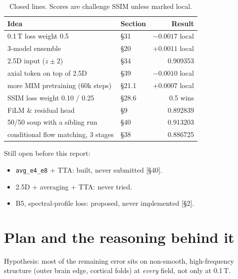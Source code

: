 \documentclass[10pt,a4paper]{article}
\begin{document}
\begin{table}[H]
\centering\small
\begin{tabular}{llr}
\toprule
Idea & Section & Result \\
\midrule
0.1\,T loss weight 0.5                & \S31   & $-0.0017$ local \\
3-model ensemble                      & \S20   & $+0.0011$ local \\
2.5D input ($z\pm2$)                  & \S34   & 0.909353 \\
axial token on top of 2.5D            & \S39   & $-0.0010$ local \\
more MIM pretraining (60k steps)      & \S21.1 & $+0.0007$ local \\
SSIM loss weight 0.10 / 0.25          & \S28.6 & 0.5 wins \\
FiLM \& residual head                 & \S9    & 0.892839 \\
50/50 soup with a sibling run         & \S40   & 0.913203 \\
conditional flow matching, 3 stages   & \S38   & 0.886725 \\
\bottomrule
\end{tabular}
\caption{Closed lines. Scores are challenge SSIM unless marked local.}
\end{table}

Still open before this report:
\begin{itemize}
  \item \texttt{avg\_e4\_e8} + TTA: built, never submitted [\S40].
  \item 2.5D + averaging + TTA: never tried.
  \item B5, spectral-profile loss: proposed, never implemented [\S2].
\end{itemize}

\section{Plan and the reasoning behind it}\label{sec:plan}

Hypothesis: most of the remaining error sits on non-smooth, high-frequency structure (outer brain
edge, cortical folds) at \emph{every} field, not only at 0.1\,T.
\end{document}
